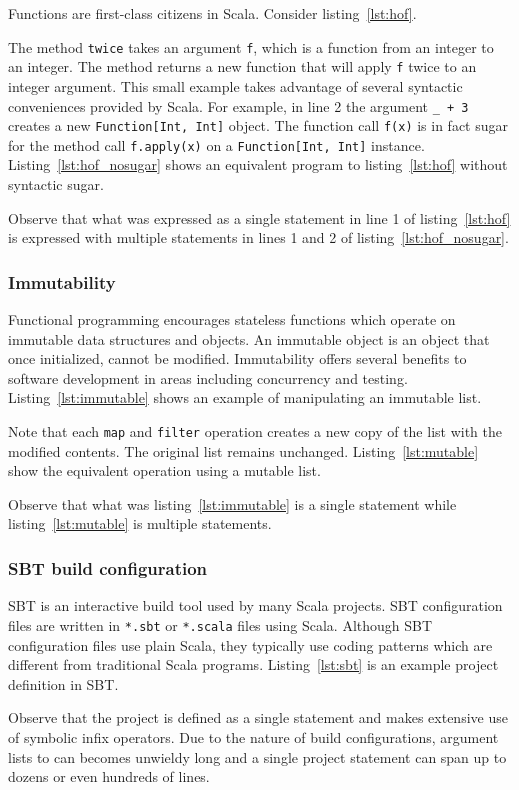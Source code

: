 \documentclass[11pt,a4paper]{article}
\begin{document}
Functions are first-class citizens in Scala.
Consider listing~\ref{lst:hof}.

The method \texttt{twice} takes an argument \texttt{f}, which is a function from an integer to an integer.
The method returns a new function that will apply \texttt{f} twice to an integer argument.
This small example takes advantage of several syntactic conveniences provided by Scala.
For example, in line 2 the argument \texttt{\_ + 3} creates a new \texttt{Function[Int, Int]} object.
The function call \texttt{f(x)} is in fact sugar for the method call \texttt{f.apply(x)} on a \texttt{Function[Int, Int]} instance.
Listing~\ref{lst:hof_nosugar} shows an equivalent program to listing~\ref{lst:hof} without syntactic sugar.

Observe that what was expressed as a single statement in line 1 of listing~\ref{lst:hof} is expressed with multiple statements in lines 1 and 2 of listing~\ref{lst:hof_nosugar}.

\subsubsection{Immutability}
Functional programming encourages stateless functions which operate on immutable data structures and objects.
An immutable object is an object that once initialized, cannot be modified.
Immutability offers several benefits to software development in areas including concurrency and testing.
Listing~\ref{lst:immutable} shows an example of manipulating an immutable list.

Note that each \texttt{map} and \texttt{filter} operation creates a new copy of the list with the modified contents.
The original list remains unchanged.
Listing~\ref{lst:mutable} show the equivalent operation using a mutable list.

Observe that what was listing~\ref{lst:immutable} is a single statement while listing~\ref{lst:mutable} is multiple statements.

\subsubsection{SBT build configuration}
SBT\autocite{_sbt_????} is an interactive build tool used by many Scala projects.
SBT configuration files are written in \texttt{*.sbt} or \texttt{*.scala} files using Scala.
Although SBT configuration files use plain Scala, they typically use coding patterns which are different from traditional Scala programs.
Listing~\ref{lst:sbt} is an example project definition in SBT.

Observe that the project is defined as a single statement and makes extensive use of symbolic infix operators.
Due to the nature of build configurations, argument lists to can becomes unwieldy long and a single project statement can span up to dozens or even hundreds of lines.
\end{document}
